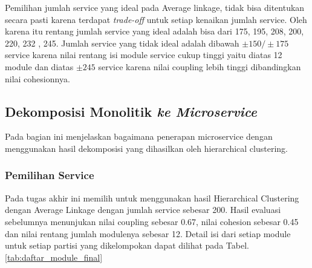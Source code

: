 Pemilihan jumlah service yang ideal pada Average linkage, tidak bisa ditentukan secara pasti karena terdapat \textit{trade-off} untuk setiap kenaikan jumlah service. Oleh karena itu rentang jumlah service yang ideal adalah bisa dari 175, 195, 208, 200, 220, 232 , 245. Jumlah service yang tidak ideal adalah dibawah $\pm 150 / \pm 175$ service karena nilai rentang isi module service cukup tinggi yaitu diatas 12 module dan diatas $\pm 245$ service karena nilai coupling lebih tinggi dibandingkan nilai cohesionnya. \\

\pagebreak

\subsection{Dekomposisi Monolitik \textit{ ke Microservice}}
Pada bagian ini menjelaskan bagaimana penerapan microservice dengan menggunakan hasil dekomposisi yang dihasilkan oleh hierarchical clustering. 

\subsubsection{Pemilihan Service}
Pada tugas akhir ini memilih untuk menggunakan hasil Hierarchical Clustering dengan Average Linkage dengan jumlah service sebesar 200. Hasil evaluasi sebelumnya menunjukan nilai coupling sebesar 0.67, nilai cohesion sebesar 0.45 dan nilai rentang jumlah modulenya sebesar 12. Detail isi dari setiap module untuk setiap partisi yang dikelompokan dapat dilihat pada Tabel. \ref{tab:daftar_module_final} 

